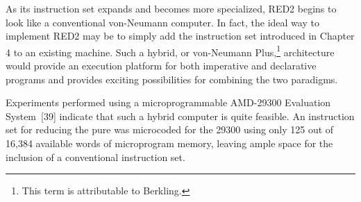 As its instruction set expands and becomes more specialized, RED2 begins to look
like a conventional von-Neumann computer. In fact, the ideal way to implement
RED2 may be to simply add the instruction set introduced in Chapter 4 to an
existing machine. Such a hybrid, or von-Neumann Plus,\footnote{This term is
attributable to Berkling.} architecture would provide an execution platform for
both imperative and declarative programs and provides exciting possibilities for
combining the two paradigms.

Experiments performed using a microprogrammable AMD-29300 Evaluation System~[39]
indicate that such a hybrid computer is quite feasible. An instruction set for
reducing the pure \lambdacalculus{} was microcoded for the 29300 using only 125
out of 16,384 available words of microprogram memory, leaving ample space for
the inclusion of a conventional instruction set.

